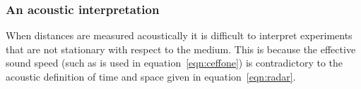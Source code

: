 \documentclass[10pt, fleqn,final,showtrims,oldfontcommands, article,a4paper,oneside]{memoir} %
\newcommand{\eqnref}[1]{\ref{eqn:#1}}
\begin{document}
\subsubsection{An acoustic interpretation}\label{sec:MMLorentzian}

When distances are measured acoustically  it is difficult to interpret experiments that are not stationary with respect to the medium. %
This is because the effective sound speed (such as is  used in equation~\ref{eqn:ceffone})
is contradictory to the acoustic definition of time and space given in equation~\ref{eqn:radar}.
%
%
%
\end{document}
